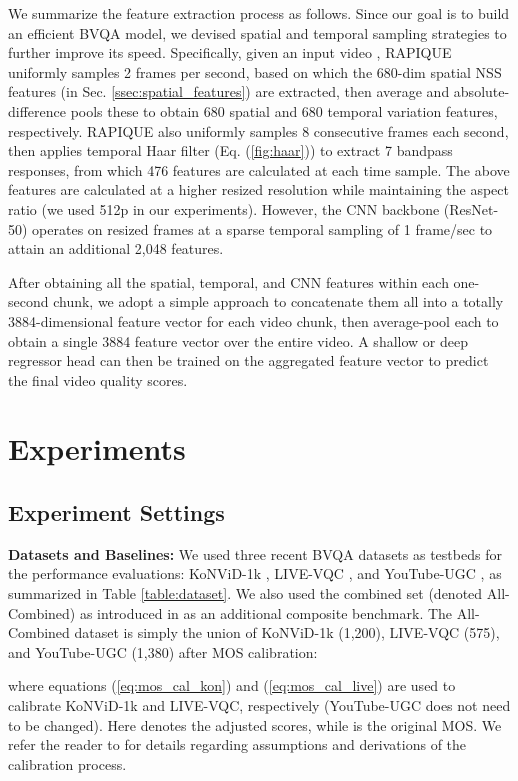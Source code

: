\documentclass[transmag]{IEEEtran}
\begin{document}
We summarize the feature extraction process as follows. Since our goal is to build an efficient BVQA model, we devised spatial and temporal sampling strategies to further improve its speed. Specifically, given an input video , RAPIQUE uniformly samples 2 frames per second, based on which the 680-dim spatial NSS features (in Sec. \ref{ssec:spatial_features}) are extracted, then average and absolute-difference pools these to obtain 680 spatial and 680 temporal variation features, respectively. RAPIQUE also uniformly samples 8 consecutive frames each second, then applies temporal Haar filter (Eq. (\ref{fig:haar})) to extract 7 bandpass responses, from which 476 features are calculated at each time sample. The above features are calculated at a higher resized resolution while maintaining the aspect ratio (we used 512p in our experiments). However, the CNN backbone (ResNet-50) operates on resized frames at a sparse temporal sampling of 1 frame/sec to attain an additional 2,048 features.

After obtaining all the spatial, temporal, and CNN features within each one-second chunk, we adopt a simple approach to concatenate them all into a totally 3884-dimensional feature vector for each video chunk, then average-pool each to obtain a single 3884 feature vector over the entire video. A shallow or deep regressor head can then be trained on the aggregated feature vector to predict the final video quality scores.

\section{Experiments}
\label{sec:experiments}

\subsection{Experiment Settings}
\label{ssec:experiment_settings}

\textbf{Datasets and Baselines:} We used three recent BVQA datasets as testbeds for the performance evaluations: KoNViD-1k \cite{hosu2017konstanz}, LIVE-VQC \cite{sinno2018large}, and YouTube-UGC \cite{wang2019youtube}, as summarized in Table \ref{table:dataset}. We also used the combined set (denoted All-Combined) as introduced in \cite{tu2020ugc} as an additional composite benchmark. The All-Combined dataset is simply the union of KoNViD-1k (1,200), LIVE-VQC (575), and YouTube-UGC (1,380) after MOS calibration:


where equations (\ref{eq:mos_cal_kon}) and (\ref{eq:mos_cal_live}) are used to calibrate KoNViD-1k and LIVE-VQC, respectively (YouTube-UGC does not need to be changed). Here  denotes the adjusted scores, while  is the original MOS. We refer the reader to \cite{tu2020ugc} for details regarding assumptions and derivations of the calibration process.
\end{document}

